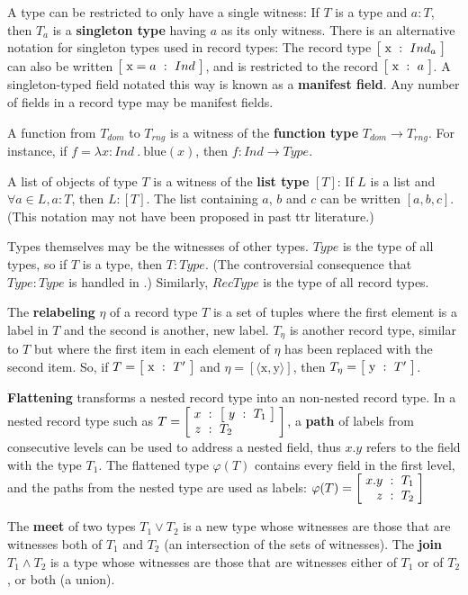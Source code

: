 A type can be restricted to only have a single witness:
If $T$ is a type and $a:T$, then $T_a$ is a \textbf{singleton type} having $a$ as its only witness.
There is an alternative notation for singleton types used in record types:
The record type $\rec{\text{x} &:& Ind_a}$ can also be written $\rec{\text{x}=a &:& Ind}$, and is restricted to the record $\rec{\text{x} &:& a}$.
A singleton-typed field notated this way is known as a \textbf{manifest field}.
Any number of fields in a record type may be manifest fields.

A function from $T_{dom}$ to $T_{rng}$ is a witness of the \textbf{function type} $T_{dom} \rightarrow T_{rng}$.
For instance, if $f = \lambda x : Ind\ .\ \text{blue}(x)$, then $f : Ind \rightarrow Type$.

A list of objects of type $T$ is a witness of the \textbf{list type} $[T]$:
If $L$ is a list and $\forall a \in L, a : T$, then $L : [T]$.
The list containing $a$, $b$ and $c$ can be written $[a, b, c]$.
(This notation may not have been proposed in past \gls{ttr} literature.)

Types themselves may be the witnesses of other types.
$Type$ is the type of all types, so if $T$ is a type, then $T : Type$.
(The controversial consequence that $Type : Type$ is handled in \citet[section 2.7]{CooperTypetheorysemantics2012}.)
Similarly, $RecType$ is the type of all record types.

The \textbf{relabeling} $\eta$ of a record type $T$ is a set of tuples where the first element is a label in $T$ and the second is another, new label.
$T_\eta$ is another record type, similar to $T$ but where the first item in each element of $\eta$ has been replaced with the second item.
So, if $T = \rec{\text{x} &:& T'}$ and $\eta = [\langle \text{x}, \text{y}\rangle]$, then $T_\eta = \rec{\text{y} &:& T'}$.

\textbf{Flattening} transforms a nested record type into an non-nested record type.
In a nested record type such as $T = \rec{x &:& \rec{y &:& T_1} \\ z &:& T_2}$, a \textbf{path} of labels from consecutive levels can be used to address a nested field, thus $x.y$ refers to the field with the type $T_1$.
The flattened type $\varphi(T)$ contains every field in the first level, and the paths from the nested type are used as labels:
$\varphi(T) = \rec{x.y &:& T_1 \\ z &:& T_2}$

The \textbf{meet} of two types $T_1 \vee T_2$ is a new type whose witnesses are those that are witnesses both of $T_1$ and $T_2$ (an intersection of the sets of witnesses).
The \textbf{join} $T_1 \wedge T_2$ is a type whose witnesses are those that are witnesses either of $T_1$ or of $T_2$, or both (a union).

